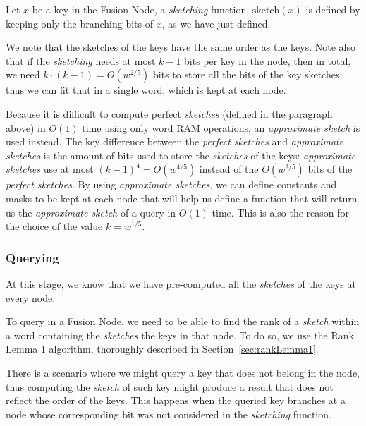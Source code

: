 Let $x$ be a key in the Fusion Node, a \textit{sketching} function, $\text{sketch}(x)$ is defined by keeping only the branching bits of $x$, as we have just defined.

We note that the sketches of the keys have the same order as the keys.
Note also that if the \textit{sketching} needs at most $k - 1$ bits per key in the node, then in total, we need $k \cdot (k - 1) = O(w^{2/5})$ bits to store all the bits of the key sketches; thus we can fit that in a single word, which is kept at each node.

Because it is difficult to compute perfect \textit{sketches} (defined in the paragraph above) in $O(1)$ time using only word RAM operations, an \textit{approximate sketch} is used instead.
The key difference between the \textit{perfect sketches} and \textit{approximate sketches} is the amount of bits used to store the \textit{sketches} of the keys: \textit{approximate sketches} use at most $(k - 1)^4 = O(w^{4/5})$ instead of the  $O(w^{2/5})$ bits of the \textit{perfect sketches}.
By using \textit{approximate sketches}, we can define constants and masks to be kept at each node that will help us define a function that will return us the \textit{approximate sketch} of a query in $O(1)$ time.
This is also the reason for the choice of the value $k = w^{1/5}$.

\subsubsection{Querying} \label{sec:fusionTreeQuerying}

At this stage, we know that we have pre-computed all the \textit{sketches} of the keys at every node.

To query in a Fusion Node, we need to be able to find the rank of a \textit{sketch} within a word containing the \textit{sketches} the keys in that node.
To do so, we use the Rank Lemma 1 algorithm, thoroughly described in Section~\ref{sec:rankLemma1}.

There is a scenario where we might query a key that does not belong in the node, thus computing the \textit{sketch} of such key might produce a result that does not reflect the order of the keys.
This happens when the queried key branches at a node whose corresponding bit was not considered in the \textit{sketching} function.

